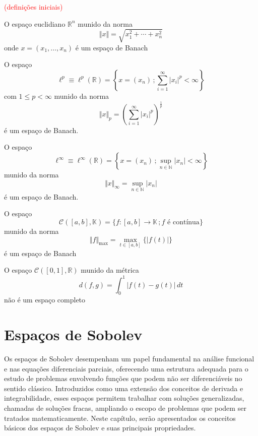 \documentclass[a4paper, 11pt]{book}
\theoremstyle{definition}
\newcommand{\bN}{\mathbb{N}}
\newcommand{\bR}{\mathbb{R}}
\newcommand{\bK}{\mathbb{K}}
\newcommand{\cC}{\mathcal{C}}
\begin{document}
\textcolor{red}{(definições iniciais)}

\begin{ex}
    O espaço euclidiano $\bR^n$ munido da norma
    \[
        \Vert x \Vert = \sqrt{x_1^2 + \cdots + x_n^2}
    \]
    onde $x = (x_1,\dots,x_n)$ é um espaço de Banach
\end{ex}

\begin{ex}
    O espaço
    \[
        \ell^p \equiv \ell^p(\bR) = \left\{ x = (x_n) \,; \sum_{i=1}^{\infty} |x_i|^p < \infty \right\}
    \]
    com $1 \leqslant p < \infty$ munido da norma
    \[
        \Vert x \Vert_p = \left( \sum_{i=1}^{\infty} |x_i|^p \right)^{\frac{1}{p}}
    \]
    é um espaço de Banach.
\end{ex}

\begin{ex}
    O espaço
    \[
        \ell^\infty \equiv \ell^\infty(\bR) = \left\{ x = (x_n) \,; \sup_{n \in \bN} |x_n| < \infty \right\}
    \]
    munido da norma
    \[
        \Vert x \Vert_\infty = \sup_{n \in \bN} |x_n|
    \]
    é um espaço de Banach.
\end{ex}

\begin{ex}
    O espaço
    \[
        \cC([a,b], \bK) = \{f : [a,b] \to \bK \,; f \text{ é contínua}\}
    \]
    munido da norma
    \[
        \Vert f \Vert_{\max} = \max_{t \in [a,b]} \{|f(t)|\}
    \]
    é um espaço de Banach
\end{ex}

\begin{ex}
    O espaço $\cC([0,1], \bR)$ munido da métrica
    \[
        d(f,g) = \int_0^1 |f(t) - g(t)| \, dt
    \]
    não é um espaço completo
\end{ex}


\chapter{Espaços de Sobolev} \label{ch:sobolev}

Os espaços de Sobolev desempenham um papel fundamental na análise funcional e nas equações diferenciais parciais, oferecendo uma estrutura adequada para o estudo de problemas envolvendo funções que podem não ser diferenciáveis no sentido clássico. Introduzidos como uma extensão dos conceitos de derivada e integrabilidade, esses espaços permitem trabalhar com soluções generalizadas, chamadas de soluções fracas, ampliando o escopo de problemas que podem ser tratados matematicamente. Neste capítulo, serão apresentados os conceitos básicos dos espaços de Sobolev e suas principais propriedades.
\end{document}

